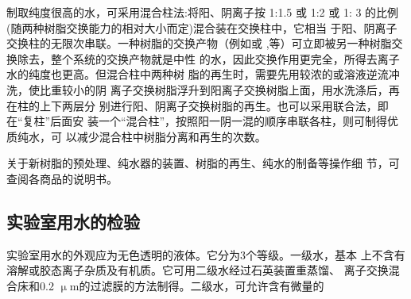 制取纯度很高的水，可采用混合柱法:将阳、阴离子按 1:1.5 或 1:2 或 1:
3 的比例(随两种树脂交换能力的相对大小而定)混合装在交换柱中，它相当
于阳、阴离子交换柱的无限次串联。一种树脂的交换产物（例如或
,等）可立即被另一种树脂交换除去，整个系统的交换产物就是中性
的水，因此交换作用更完全，所得去离子水的纯度也更高。但混合柱中两种树
脂的再生时，需要先用较浓的或溶液逆流冲洗，使比重较小的阴
离子交换树脂浮升到阳离子交换树脂上面，用水洗涤后，再在柱的上下两层分
别进行阳、阴离子交换树脂的再生。也可以采用联合法，即在“复柱”后面安
装一个“混合柱”，按照阳一阴一混的顺序串联各柱，则可制得优质纯水，可
以减少混合柱中树脂分离和再生的次数。

关于新树脂的预处理、纯水器的装置、树脂的再生、纯水的制备等操作细
节，可查阅各商品的说明书。


\subsection{实验室用水的检验}

实验室用水的外观应为无色透明的液体。它分为3个等级。一级水，基本
上不含有溶解或胶态离子杂质及有机质。它可用二级水经过石英装置重蒸馏、
离子交换混合床和0.2 $\upmu$m的过滤膜的方法制得。二级水，可允许含有微量的
